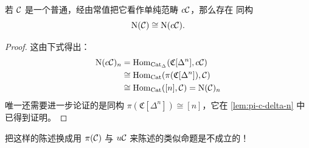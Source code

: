 \begin{lemma}\label{lem:nerve-c-c}
若 $\mathcal{C}$ 是一个普通\trCategory{}，经由常值\trFunctor{}把它看作单纯\trEnrichment{}范畴 $c\mathcal{C}$，那么存在
同构
\[
\mathrm{N}(\mathcal{C}) \cong \mathrm{N}(c\mathcal{C}).
\]
\end{lemma}

\begin{proof}
这由下式得出：
\[
\begin{aligned}
\mathrm{N}(c\mathcal{C})_n
&= \mathrm{Hom}_{\mathrm{Cat}_{\Delta}}(\mathfrak{C}[\Delta^n], c\mathcal{C})\\
&\cong \mathrm{Hom}_{\mathrm{Cat}}(\pi(\mathfrak{C}[\Delta^n]), \mathcal{C})\\
&\cong \mathrm{Hom}_{\mathrm{Cat}}([n], \mathcal{C}) = \mathrm{N}(\mathcal{C})_n
\end{aligned}
\]
唯一还需要进一步论证的是同构 $\pi(\mathfrak{C}[\Delta^n]) \cong [n]$，它在
\cref{lem:pi-c-delta-n} 中已得到证明。
\end{proof}

\begin{remark}\label{rem:pi-u-analog-wrong}
把这样的陈述换成用 $\pi(\mathcal{C})$ 与 $u\mathcal{C}$ 来陈述的类似命题是不成立的！
\end{remark}

